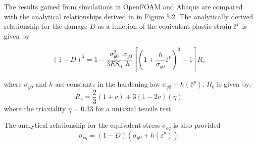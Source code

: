 \documentclass[sn-mathphys,Numbered,draft]{sn-jnl}%
\begin{document}
\begin{appendices}
The results gained from simulations in OpenFOAM and Abaqus are compared with the analytical relationships derived in \citet{doghri_numerical_1995} in Figure 5.2. The analytically derived relationship for the damage $D$ as a function of the equivalent plastic strain ${\bar{\varepsilon}}^p$ is given by

\begin{equation}
(1-D)^2=1-\frac{\sigma_{y0}^2}{3 E S_0} \frac{\sigma_{y0}}{h}\left[\left(1+\frac{h}{\sigma_{y0}} {\bar{\varepsilon}}^p\right)^3-1\right] R_v
\end{equation}

where $\sigma_{y0}$ and $h$ are constants in the hardening law $\sigma_{y0}+h({\bar{\varepsilon}}^p)$. $R_v$ is given by:
\begin{equation}
    R_v=\frac{2}{3}(1+v)+3(1-2v)(\eta)
\end{equation}
where the triaxiality $\eta=0.33$ for a uniaxial tensile test.

The analytical relationship for the equivalent stress $\sigma_{eq}$ is also provided 
\begin{equation}
    \sigma_{eq}=(1-D)(\sigma_{y0}+h({\bar{\varepsilon}}^p))
\end{equation}


\end{appendices}
\end{document}
